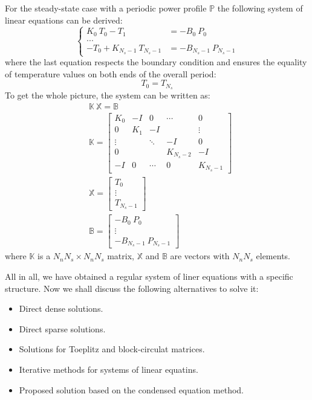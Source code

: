 For the steady-state case with a periodic power profile $\mathbb{P}$ the following system of linear equations can be derived:
\[
  \begin{cases}
    K_0 \: T_0 - T_1 & = -B_0 \: P_0 \\
    ... \\
    -T_0 + K_{N_s - 1} \: T_{N_s - 1} & = -B_{N_s - 1} \: P_{N_s - 1}
  \end{cases}
\]
where the last equation respects the boundary condition and ensures the equality of temperature values on both ends of the overall period:
\begin{equation} \label{eq:boundary-condition}
  T_0 = T_{N_s}
\end{equation}
To get the whole picture, the system can be written as:
\begin{align}
  & \mathbb{K} \: \mathbb{X} = \mathbb{B} \label{eq:system} \\
  & \mathbb{K} = \left[
    \begin{array}{ccccc}
      K_0 & -I & 0 & \cdots & 0 \\
      0 & K_1 & -I &  & \vdots \\
      \vdots &  & \ddots & -I & 0 \\
      0 &  &  & K_{N_s - 2} & -I \\
      -I & 0 & \cdots & 0 & K_{N_s - 1}
    \end{array}
  \right] \nonumber \\
  & \mathbb{X} = \left[
    \begin{array}{c}
      T_0 \\
      \vdots \\
      T_{N_s - 1}
    \end{array}
  \right] \nonumber \\
  & \mathbb{B} = \left[
    \begin{array}{c}
      -B_0 \: P_0 \\
      \vdots \\
      -B_{N_s - 1} \: P_{N_s - 1}
    \end{array}
  \right] \nonumber
\end{align}
where $\mathbb{K}$ is a $N_n N_s \times N_n N_s$ matrix, $\mathbb{X}$ and $\mathbb{B}$ are vectors with $N_n N_s$ elements.

All in all, we have obtained a regular system of liner equations with a specific structure. Now we shall discuss the following alternatives to solve it:
\begin{itemize}
  \item Direct dense solutions.
  \item Direct sparse solutions.
  \item Solutions for Toeplitz and block-circulat matrices.
  \item Iterative methods for systems of linear equatins.
  \item Proposed solution based on the condensed equation method.
\end{itemize}

